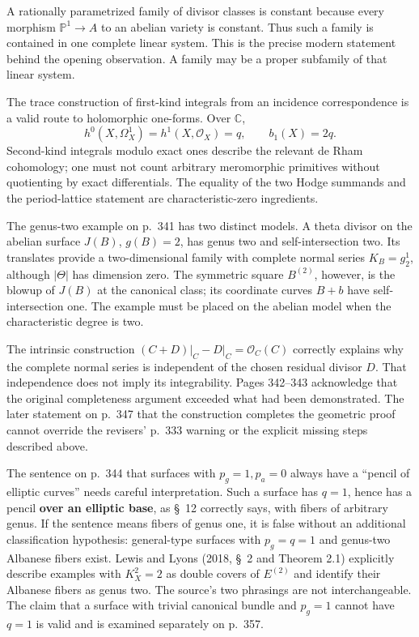 A rationally parametrized family of divisor classes is constant because every morphism \(\mathbb P^1\to A\) to an abelian variety is constant. Thus such a family is contained in one complete linear system. This is the precise modern statement behind the opening observation. A family may be a proper subfamily of that linear system.

The trace construction of first-kind integrals from an incidence correspondence is a valid route to holomorphic one-forms. Over \(\mathbb C\),
\[
h^0(X,\Omega_X^1)=h^1(X,\mathcal O_X)=q,
\qquad b_1(X)=2q.
\]
Second-kind integrals modulo exact ones describe the relevant de Rham cohomology; one must not count arbitrary meromorphic primitives without quotienting by exact differentials. The equality of the two Hodge summands and the period-lattice statement are characteristic-zero ingredients.

The genus-two example on p.~341 has two distinct models. A theta divisor on the abelian surface \(J(B)\), \(g(B)=2\), has genus two and self-intersection two. Its translates provide a two-dimensional family with complete normal series \(K_B=g^1_2\), although \(\vert \Theta\vert \) has dimension zero. The symmetric square \(B^{(2)}\), however, is the blowup of \(J(B)\) at the canonical class; its coordinate curves \(B+b\) have self-intersection one. The example must be placed on the abelian model when the characteristic degree is two.

The intrinsic construction \((C+D)\vert _C-D\vert _C=\mathcal O_C(C)\) correctly explains why the complete normal series is independent of the chosen residual divisor \(D\). That independence does not imply its integrability. Pages 342--343 acknowledge that the original completeness argument exceeded what had been demonstrated. The later statement on p.~347 that the construction completes the geometric proof cannot override the revisers' p.~333 warning or the explicit missing steps described above.

The sentence on p.~344 that surfaces with \(p_g=1,p_a=0\) always have a ``pencil of elliptic curves'' needs careful interpretation. Such a surface has \(q=1\), hence has a pencil \textbf{over an elliptic base}, as \S~12 correctly says, with fibers of arbitrary genus. If the sentence means fibers of genus one, it is false without an additional classification hypothesis: general-type surfaces with \(p_g=q=1\) and genus-two Albanese fibers exist. Lewis and Lyons (2018, \S~2 and Theorem 2.1) explicitly describe examples with \(K_X^2=2\) as double covers of \(E^{(2)}\) and identify their Albanese fibers as genus two. The source's two phrasings are not interchangeable. The claim that a surface with trivial canonical bundle and \(p_g=1\) cannot have \(q=1\) is valid and is examined separately on p.~357.

